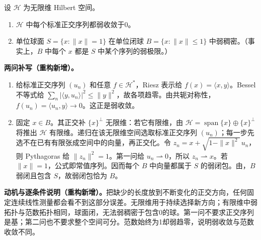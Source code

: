 \documentclass[../../main.tex]{subfiles}
\begin{document}
\begin{exercise}\label{exercise:ch05-weak-sphere}
设 $\mathscr H$ 为无限维 Hilbert 空间。
\begin{enumerate}
\item\label{item:ch05-orthonormal-weak-zero} $\mathscr H$ 中每个标准正交序列都弱收敛于0。
\item\label{item:ch05-sphere-weakly-dense} 单位球面 $S=\{x:\|x\|=1\}$ 在单位闭球 $B=\{x:\|x\|\leqslant1\}$ 中弱稠密。（事实上，$B$ 中每个 $x$ 都是 $S$ 中某个序列的弱极限。）
\end{enumerate}
\end{exercise}
\begin{solution}
\textbf{两问补写（重构新增）。}
\begin{enumerate}
\item 给标准正交序列 $(u_n)$ 和任意 $f\in\mathscr H^*$，Riesz 表示给 $f(x)=\langle x,y\rangle$。Bessel 不等式给 $\sum_n|\langle y,u_n\rangle|^2\leqslant\|y\|^2$，故各项趋零。由共轭对称性，$f(u_n)=\langle u_n,y\rangle\to0$。这正是弱收敛。
\item 固定 $x\in B$。其正交补 $\{x\}^\perp$ 无限维：若它有限维，由 $\mathscr H=\operatorname{span}\{x\}\oplus\{x\}^\perp$ 将推出 $\mathscr H$ 有限维。递归在该无限维空间选取标准正交序列 $(u_n)$；每一步先选不在已有有限张成空间中的向量，再正交化。令 $z_n=x+\sqrt{1-\|x\|^2}\,u_n$，则 Pythagoras 给 $\|z_n\|^2=1$。第一问给 $u_n\rightharpoonup0$，所以 $z_n\rightharpoonup x$。若 $\|x\|=1$，公式即常值序列。因而每个 $B$ 中向量都属于 $S$ 的弱闭包。由，$B$ 弱闭且包含 $S$，故弱闭包恰为 $B$。
\end{enumerate}
\end{solution}
\begin{remark}
\textbf{动机与逐条件说明（重构新增）。}把缺少的长度放到不断变化的正交方向，任何固定连续线性测量都会看不到这部分误差。无限维用于持续选择新方向；有限维中弱拓扑与范数拓扑相同，球面闭，无法弱稠密于包含0的球。第一问不要求正交序列是基；第二问也不要求整个空间可分。范数始终为1却弱趋零，说明弱收敛与范数收敛不同。
\end{remark}
\end{document}
